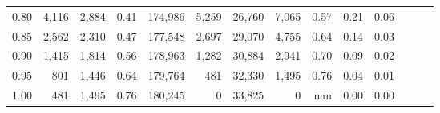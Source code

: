 \begin{tabular}{rrrrrrrrrrrrrr}
0.80 &   4,116 &  2,884 &  0.41 &  174,986 &    5,259 &  26,760 &   7,065 &  0.57 &  0.21 &      0.06 \\
0.85 &   2,562 &  2,310 &  0.47 &  177,548 &    2,697 &  29,070 &   4,755 &  0.64 &  0.14 &      0.03 \\
0.90 &   1,415 &  1,814 &  0.56 &  178,963 &    1,282 &  30,884 &   2,941 &  0.70 &  0.09 &      0.02 \\
0.95 &     801 &  1,446 &  0.64 &  179,764 &      481 &  32,330 &   1,495 &  0.76 &  0.04 &      0.01 \\
1.00 &     481 &  1,495 &  0.76 &  180,245 &        0 &  33,825 &       0 &   nan &  0.00 &      0.00 \\
\bottomrule
\end{tabular}

